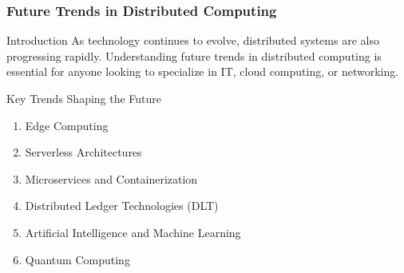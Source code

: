 \documentclass[aspectratio=169]{beamer}
\begin{document}
\begin{frame}[fragile]
  \frametitle{Future Trends in Distributed Computing}
  
  \begin{block}{Introduction}
    As technology continues to evolve, distributed systems are also progressing rapidly. Understanding future trends in distributed computing is essential for anyone looking to specialize in IT, cloud computing, or networking.
  \end{block}

  \begin{block}{Key Trends Shaping the Future}
    \begin{enumerate}
      \item Edge Computing
      \item Serverless Architectures
      \item Microservices and Containerization
      \item Distributed Ledger Technologies (DLT)
      \item Artificial Intelligence and Machine Learning
      \item Quantum Computing
    \end{enumerate}
  \end{block}
\end{frame}
\end{document}
